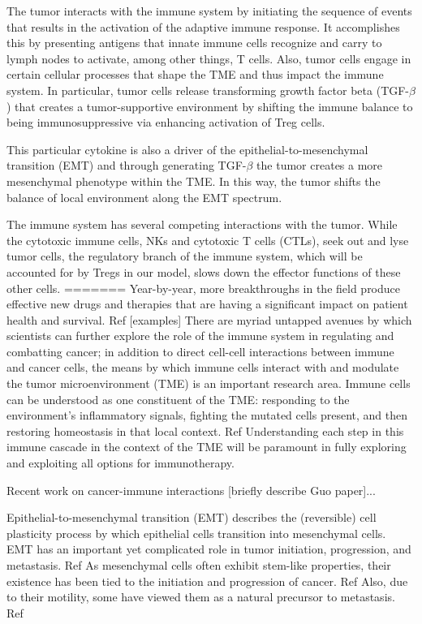 \documentclass{article}
\begin{document}
The tumor interacts with the immune system by initiating the sequence of events that results in the activation of the adaptive immune response.
It accomplishes this by presenting antigens that innate immune cells recognize and carry to lymph nodes to activate, among other things, T cells.
Also, tumor cells engage in certain cellular processes that shape the TME and thus impact the immune system.
In particular, tumor cells release transforming growth factor beta (TGF-$\beta$) that creates a tumor-supportive environment by shifting the immune balance to being immunosuppressive via enhancing activation of Treg cells.

This particular cytokine is also a driver of the epithelial-to-mesenchymal transition (EMT) and through generating TGF-$\beta$ the tumor creates a more mesenchymal phenotype within the TME.
In this way, the tumor shifts the balance of local environment along the EMT spectrum.

The immune system has several competing interactions with the tumor.
While the cytotoxic immune cells, NKs and cytotoxic T cells (CTLs), seek out and lyse tumor cells, the regulatory branch of the immune system, which will be accounted for by Tregs in our model, slows down the effector functions of these other cells.
=======
Year-by-year, more breakthroughs in the field produce effective new drugs and therapies that are having a significant impact on patient health and survival. Ref  [examples] 
There are myriad untapped avenues by which scientists can further explore the role of the immune system in regulating and combatting cancer; in addition to direct cell-cell interactions between immune and cancer cells, the means by which immune cells interact with and modulate the tumor microenvironment (TME) is an important research area. Immune cells can be understood as one constituent of the TME: responding to the environment's inflammatory signals, fighting the mutated cells present, and then restoring homeostasis in that local context. Ref 
Understanding each step in this immune cascade in the context of the TME will be paramount in fully exploring and exploiting all options for immunotherapy.

Recent work on cancer-immune interactions [briefly describe Guo paper]...

Epithelial-to-mesenchymal transition (EMT) describes the (reversible) cell plasticity process by which epithelial cells transition into mesenchymal cells. EMT has an important yet complicated role in tumor initiation, progression, and metastasis. Ref 
As mesenchymal cells often exhibit stem-like properties, their existence has been tied to the initiation and progression of cancer. Ref
Also, due to their motility, some have viewed them as a natural precursor to metastasis. Ref 
\end{document}
